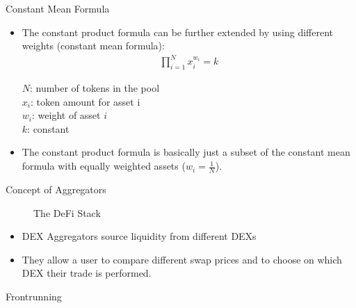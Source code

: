 \documentclass[]{beamer}
\begin{document}
\begin{frame}{Constant Mean Formula}
\begin{itemize}
	\item The constant product formula can be further extended by using different weights (constant mean formula):
		\begin{align*}
			\prod_{i=1}^N x_i^{w_i}= k
		\end{align*}

		$N$: number of tokens in the pool\\
		$x_i$: token amount for asset i\\
		$w_i$: weight of asset $i$\\
		$k$: constant
		\vspace{0.5cm}
	\item The constant product formula is basically just a subset of the constant mean formula with equally weighted assets ($w_i = \tfrac{1}{N}$).
\end{itemize}

\end{frame}


\begin{frame}{Concept of Aggregators}

\begin{figure}[t]
	\centering	
	\resizebox{0.8\textwidth}{!}{
	\begin{tikzpicture}[scale=1.0, every node/.style={scale=1.0}]
			
	\end{tikzpicture}}
	\caption{The DeFi Stack \cite{FS:21}}
\end{figure}
\vspace{-1em}
\begin{itemize}
	\item DEX Aggregators source liquidity from different DEXs
	\item They allow a user to compare different swap prices and to choose on which DEX their trade is performed.
\end{itemize}


\end{frame}


\begin{frame}{Frontrunning}

\end{frame}
\end{document}
